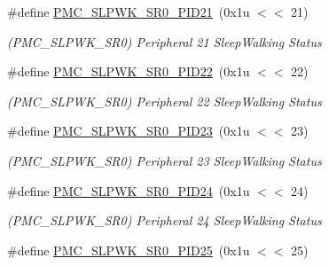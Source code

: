 \begin{DoxyCompactItemize}
\mbox{\label{group__SAME70__PMC_ga4c4c2814c433de0b3ae83e8cd1aa08c6}} 
\#define \mbox{\hyperlink{group__SAME70__PMC_ga4c4c2814c433de0b3ae83e8cd1aa08c6}{P\+M\+C\+\_\+\+S\+L\+P\+W\+K\+\_\+\+S\+R0\+\_\+\+P\+I\+D21}}~(0x1u $<$$<$ 21)
\begin{DoxyCompactList}\small\item\em (P\+M\+C\+\_\+\+S\+L\+P\+W\+K\+\_\+\+S\+R0) Peripheral 21 Sleep\+Walking Status \end{DoxyCompactList}\item 
\mbox{\label{group__SAME70__PMC_gaa5f77da184e5175a64fd9dd93e0adc7b}} 
\#define \mbox{\hyperlink{group__SAME70__PMC_gaa5f77da184e5175a64fd9dd93e0adc7b}{P\+M\+C\+\_\+\+S\+L\+P\+W\+K\+\_\+\+S\+R0\+\_\+\+P\+I\+D22}}~(0x1u $<$$<$ 22)
\begin{DoxyCompactList}\small\item\em (P\+M\+C\+\_\+\+S\+L\+P\+W\+K\+\_\+\+S\+R0) Peripheral 22 Sleep\+Walking Status \end{DoxyCompactList}\item 
\mbox{\label{group__SAME70__PMC_ga81ac1e46ee8c5b920e9b400ef630c459}} 
\#define \mbox{\hyperlink{group__SAME70__PMC_ga81ac1e46ee8c5b920e9b400ef630c459}{P\+M\+C\+\_\+\+S\+L\+P\+W\+K\+\_\+\+S\+R0\+\_\+\+P\+I\+D23}}~(0x1u $<$$<$ 23)
\begin{DoxyCompactList}\small\item\em (P\+M\+C\+\_\+\+S\+L\+P\+W\+K\+\_\+\+S\+R0) Peripheral 23 Sleep\+Walking Status \end{DoxyCompactList}\item 
\mbox{\label{group__SAME70__PMC_ga9489805fde5c17ca52b5cecbe55b2b8b}} 
\#define \mbox{\hyperlink{group__SAME70__PMC_ga9489805fde5c17ca52b5cecbe55b2b8b}{P\+M\+C\+\_\+\+S\+L\+P\+W\+K\+\_\+\+S\+R0\+\_\+\+P\+I\+D24}}~(0x1u $<$$<$ 24)
\begin{DoxyCompactList}\small\item\em (P\+M\+C\+\_\+\+S\+L\+P\+W\+K\+\_\+\+S\+R0) Peripheral 24 Sleep\+Walking Status \end{DoxyCompactList}\item 
\mbox{\label{group__SAME70__PMC_ga7e24a1f1f3d0136da4d8c6b22c6e3383}} 
\#define \mbox{\hyperlink{group__SAME70__PMC_ga7e24a1f1f3d0136da4d8c6b22c6e3383}{P\+M\+C\+\_\+\+S\+L\+P\+W\+K\+\_\+\+S\+R0\+\_\+\+P\+I\+D25}}~(0x1u $<$$<$ 25)
$$
\end{DoxyCompactItemize}
